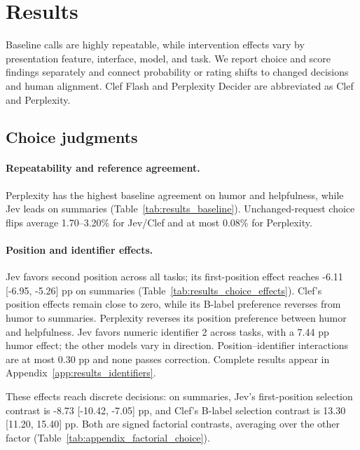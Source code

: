\section{Results}
\label{sec:results}
Baseline calls are highly repeatable, while intervention effects vary by presentation feature, interface, model, and task. We report choice and score findings separately and connect probability or rating shifts to changed decisions and human alignment. Clef Flash and Perplexity Decider are abbreviated as Clef and Perplexity.



\subsection{Choice judgments}

\paragraph{Repeatability and reference agreement.}
Perplexity has the highest baseline agreement on humor and helpfulness, while Jev leads on summaries (Table~\ref{tab:results_baseline}). Unchanged-request choice flips average 1.70--3.20\% for Jev/Clef and at most 0.08\% for Perplexity.



\paragraph{Position and identifier effects.}
Jev favors second position across all tasks; its first-position effect reaches -6.11 [-6.95, -5.26] pp on summaries (Table~\ref{tab:results_choice_effects}). Clef's position effects remain close to zero, while its B-label preference reverses from humor to summaries. Perplexity reverses its position preference between humor and helpfulness. Jev favors numeric identifier 2 across tasks, with a 7.44 pp humor effect; the other models vary in direction. Position--identifier interactions are at most 0.30 pp and none passes correction. Complete results appear in Appendix~\ref{app:results_identifiers}.

These effects reach discrete decisions: on summaries, Jev's first-position selection contrast is -8.73 [-10.42, -7.05] pp, and Clef's B-label selection contrast is 13.30 [11.20, 15.40] pp. Both are signed factorial contrasts, averaging over the other factor (Table~\ref{tab:appendix_factorial_choice}).

